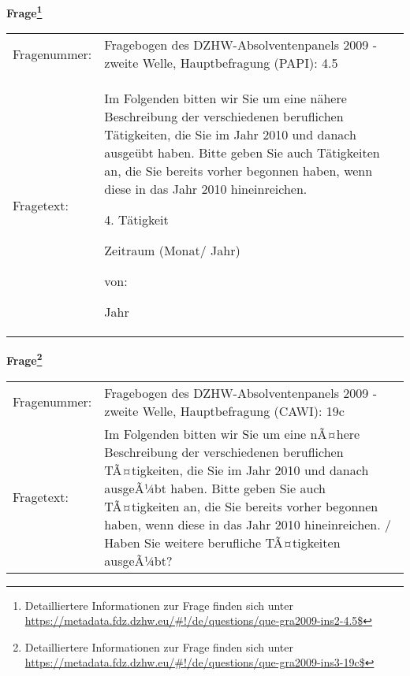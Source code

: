 				\vspace*{0.5cm}
                \noindent\textbf{Frage\footnote{Detailliertere Informationen zur Frage finden sich unter
		              \url{https://metadata.fdz.dzhw.eu/\#!/de/questions/que-gra2009-ins2-4.5$}}}\\
				\begin{tabularx}{\hsize}{@{}lX}
					Fragenummer: &
					  Fragebogen des DZHW-Absolventenpanels 2009 - zweite Welle, Hauptbefragung (PAPI):
					  4.5
 \\
					Fragetext: & Im Folgenden bitten wir Sie um eine nähere Beschreibung der verschiedenen beruflichen Tätigkeiten, die Sie im Jahr 2010 und danach ausgeübt haben. Bitte geben Sie auch Tätigkeiten an, die Sie bereits vorher begonnen haben, wenn diese in das Jahr 2010 hineinreichen.\par  4. Tätigkeit\par  Zeitraum (Monat/ Jahr)\par  von:\par  Jahr \\
				\end{tabularx}
				\vspace*{0.5cm}
                \noindent\textbf{Frage\footnote{Detailliertere Informationen zur Frage finden sich unter
		              \url{https://metadata.fdz.dzhw.eu/\#!/de/questions/que-gra2009-ins3-19c$}}}\\
				\begin{tabularx}{\hsize}{@{}lX}
					Fragenummer: &
					  Fragebogen des DZHW-Absolventenpanels 2009 - zweite Welle, Hauptbefragung (CAWI):
					  19c
 \\
					Fragetext: & Im Folgenden bitten wir Sie um eine nÃ¤here Beschreibung der verschiedenen beruflichen TÃ¤tigkeiten, die Sie im Jahr 2010 und danach ausgeÃ¼bt haben. Bitte geben Sie auch TÃ¤tigkeiten an, die Sie bereits vorher begonnen haben, wenn diese in das Jahr 2010 hineinreichen. / Haben Sie weitere berufliche TÃ¤tigkeiten ausgeÃ¼bt? \\
				\end{tabularx}





